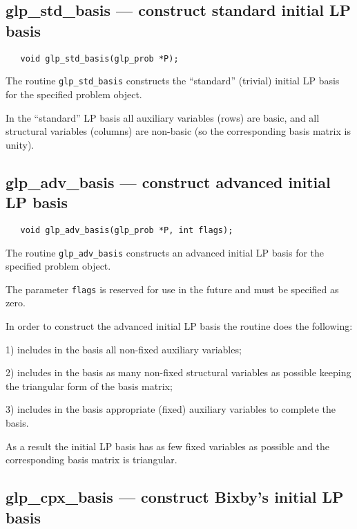 \subsection{glp\_std\_basis --- construct standard initial LP basis}

\synopsis

\begin{verbatim}
   void glp_std_basis(glp_prob *P);
\end{verbatim}

\description

The routine \verb|glp_std_basis| constructs the ``standard'' (trivial)
initial LP basis for the specified problem object.

In the ``standard'' LP basis all auxiliary variables (rows) are basic,
and all structural variables (columns) are non-basic (so the
corresponding basis matrix is unity).

\subsection{glp\_adv\_basis --- construct advanced initial LP basis}

\synopsis

\begin{verbatim}
   void glp_adv_basis(glp_prob *P, int flags);
\end{verbatim}

\description

The routine \verb|glp_adv_basis| constructs an advanced initial LP
basis for the specified problem object.

The parameter \verb|flags| is reserved for use in the future and must
be specified as zero.

In order to construct the advanced initial LP basis the routine does
the following:

1) includes in the basis all non-fixed auxiliary variables;

2) includes in the basis as many non-fixed structural variables as
possible keeping the triangular form of the basis matrix;

3) includes in the basis appropriate (fixed) auxiliary variables to
complete the basis.

As a result the initial LP basis has as few fixed variables as possible
and the corresponding basis matrix is triangular.

\subsection{glp\_cpx\_basis --- construct Bixby's initial LP basis}

